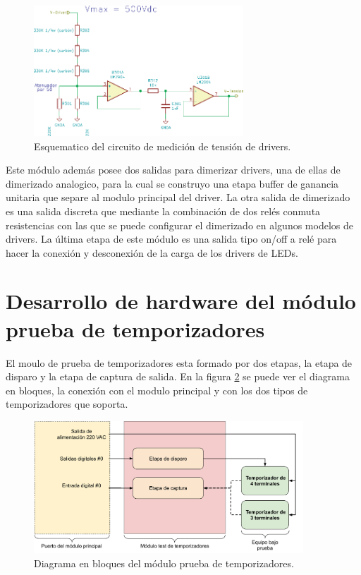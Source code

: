 \begin{figure}[H]
	\centering
	\includegraphics[width=0.7\textwidth]{./Figures/MedicionTension.pdf}
	\caption{Esquematico del circuito de medición de tensión de drivers.}
	\label{fig:MedicionTension}
\end{figure}

Este módulo además posee dos salidas para dimerizar drivers, una de ellas de dimerizado analogico, para la cual se construyo una etapa buffer de ganancia unitaria que separe al modulo principal del driver. La otra salida de dimerizado es una salida discreta que mediante la combinación de dos relés conmuta resistencias con las que se puede configurar el dimerizado en algunos modelos de drivers.
La última etapa de este módulo es una salida tipo on/off a relé para hacer la conexión y desconexión de la carga de los drivers de LEDs.


\section{Desarrollo de hardware del módulo prueba de temporizadores}

El moulo de prueba de temporizadores esta formado por dos etapas, la etapa de disparo y la etapa de captura de salida. En la figura \ref{fig:BloquesTestTemp} se puede ver el diagrama en bloques, la conexión con el modulo principal y con los dos tipos de temporizadores que soporta.


\begin{figure}[H]
	\centering
	\includegraphics[width=0.9\textwidth]{./Figures/BloquesTestTemp.pdf}
	\caption{Diagrama en bloques del módulo prueba de temporizadores.}
	\label{fig:BloquesTestTemp}
\end{figure}


